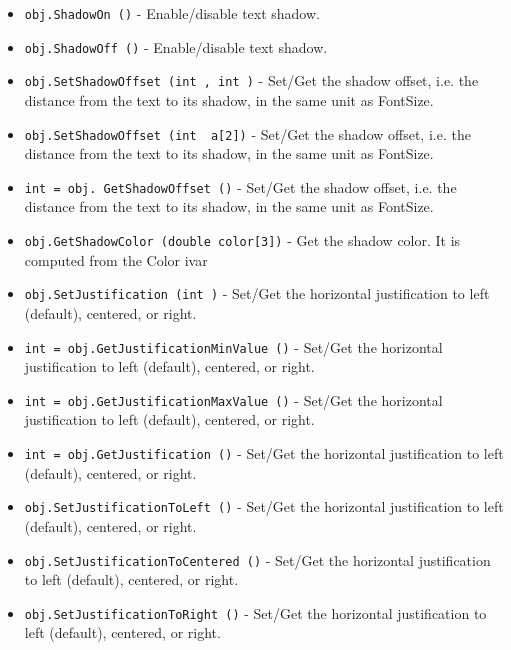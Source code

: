 \begin{itemize}
\item  \verb|obj.ShadowOn ()| -  Enable/disable text shadow.

\item  \verb|obj.ShadowOff ()| -  Enable/disable text shadow.

\item  \verb|obj.SetShadowOffset (int , int )| -  Set/Get the shadow offset, i.e. the distance from the text to
 its shadow, in the same unit as FontSize.

\item  \verb|obj.SetShadowOffset (int  a[2])| -  Set/Get the shadow offset, i.e. the distance from the text to
 its shadow, in the same unit as FontSize.

\item  \verb|int = obj. GetShadowOffset ()| -  Set/Get the shadow offset, i.e. the distance from the text to
 its shadow, in the same unit as FontSize.

\item  \verb|obj.GetShadowColor (double color[3])| -  Get the shadow color. It is computed from the Color ivar

\item  \verb|obj.SetJustification (int )| -  Set/Get the horizontal justification to left (default), centered,
 or right.

\item  \verb|int = obj.GetJustificationMinValue ()| -  Set/Get the horizontal justification to left (default), centered,
 or right.

\item  \verb|int = obj.GetJustificationMaxValue ()| -  Set/Get the horizontal justification to left (default), centered,
 or right.

\item  \verb|int = obj.GetJustification ()| -  Set/Get the horizontal justification to left (default), centered,
 or right.

\item  \verb|obj.SetJustificationToLeft ()| -  Set/Get the horizontal justification to left (default), centered,
 or right.

\item  \verb|obj.SetJustificationToCentered ()| -  Set/Get the horizontal justification to left (default), centered,
 or right.

\item  \verb|obj.SetJustificationToRight ()| -  Set/Get the horizontal justification to left (default), centered,
 or right.


\end{itemize}
